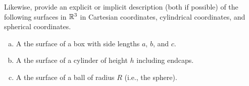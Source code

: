 \documentclass[12pt]{article} %
\begin{document}
\vspace*{1cm}
\begin{problem}
Likewise, provide an explicit or implicit description (both if possible) of the following surfaces in $\mathbb{R}^3$ in Cartesian coordinates, cylindrical coordinates, and spherical coordinates.
    \begin{enumerate}[(a)]
        \item A the surface of a box with side lengths $a$, $b$, and $c$.
        \item A the surface of a cylinder of height $h$ including endcaps.
        \item A the surface of a ball of radius $R$ (i.e., the sphere).
    \end{enumerate}
\end{problem}

\vspace*{1cm}
\end{document}
